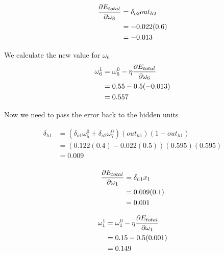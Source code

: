 \documentclass[10pt,a4paper]{article}
\begin{document}
\begin{equation}
\begin{split}
\pdv{E_{total}}{\omega_8} &= \delta_{o2}out_{h2}\\
                          &= -0.022(0.6)\\
                          &= -0.013\\
\end{split}
\end{equation}

We calculate the new value for $\omega_6$
\begin{equation}
\begin{split}
\omega_6^1 &= \omega_6^0 - \eta\pdv{E_{total}}{\omega_6}\\
           &= 0.55 -0.5(-0.013)\\
           &= 0.557\\
\end{split}
\end{equation}

Now we need to pass the error back to the hidden units

\begin{equation}
\begin{split}
\delta_{h1} &= (\delta_{o1}\omega_5^0 + \delta_{o2}\omega_7^0)(out_{h1})(1-out_{h1})\\
&= (0.122(0.4) -0.022(0.5))(0.595)(0.595)\\
&= 0.009\\
\end{split}
\end{equation}

\begin{equation}
\begin{split}
\pdv{E_{total}}{\omega_1} &= \delta_{h1}x_1\\ 
                          &= 0.009(0.1)\\
                          &= 0.001\\
\end{split}
\end{equation}

\begin{equation}
\begin{split}
\omega_1^1 &= \omega_1^0 - \eta\pdv{E_{total}}{\omega_1}\\
           &= 0.15 -0.5(0.001)\\
           &= 0.149\\
\end{split}
\end{equation}
\end{document}
